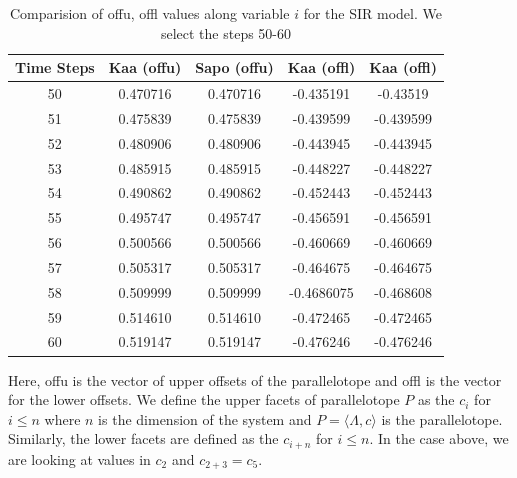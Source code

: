 \documentclass[EPiC]{easychair}
\begin{document}
\begin{table}[h]
\centering
\begin{tabular}{|c| c c c c|}
    \hline
    {\bf Time Steps} & {\bf Kaa (offu) }  & { \bf Sapo (offu) } & {\bf Kaa (offl)} & {\bf Kaa (offl) }  \\
    \hline
     50 & 0.470716 & 0.470716 & -0.435191 & -0.43519 \\
  
     51 & 0.475839 & 0.475839 & -0.439599 & -0.439599 \\ 

     52 & 0.480906 & 0.480906 & -0.443945 & -0.443945\\

     53 & 0.485915 &  0.485915 & -0.448227 &  -0.448227 \\ 

     54 & 0.490862 & 0.490862 & -0.452443 & -0.452443 \\ 

     55 & 0.495747 & 0.495747 & -0.456591 & -0.456591 \\

     56 & 0.500566 & 0.500566 & -0.460669 & -0.460669 \\ 

     57 & 0.505317 & 0.505317 & -0.464675 & -0.464675\\ 

     58 & 0.509999 & 0.509999  & -0.4686075 & -0.468608 \\ 

     59 & 0.514610 & 0.514610 & -0.472465 & -0.472465\\

     60 & 0.519147 & 0.519147 & -0.476246 & -0.476246 \\
    \hline
\end{tabular}
\caption{Comparision of offu, offl values along variable $i$ for the SIR model. We select the steps 50-60}
\label{val1}
\end{table}
\noindent Here, offu is the vector of upper offsets of the parallelotope and offl is the vector for the lower offsets. We define the upper facets of parallelotope $P$ as the $c_i$ for $i \leq n$ where $n$ is the dimension of the system and $P = \langle \Lambda, c \rangle$ is the parallelotope. Similarly, the lower facets are defined as the $c_{i+n}$ for $i \leq n$. In the case above, we are looking at values in $c_2$ and $c_{2+3} = c_5$.
\end{document}
